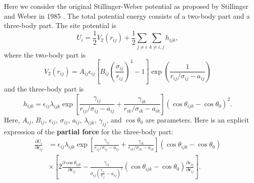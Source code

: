 \documentclass[12pt,a4paper]{report}
\newcommand{\vect}[1]{\boldsymbol{#1}}
\begin{document}
Here we consider the original Stillinger-Weber potential as proposed by Stillinger and Weber in 1985 \cite{stillinger1985prb}.
The total potential energy consists of a two-body part and a three-body part. The site potential is
\begin{equation}
U_i = \frac{1}{2} V_2(r_{ij}) + \frac{1}{2}\sum_{j\neq i}\sum_{k\neq i,j} h_{ijk},
\end{equation}
where the two-body part is
\begin{equation}
V_2(r_{ij}) =  A_{ij} \epsilon_{ij}
\left[
  B_{ij} \left( \frac{\sigma_{ij} }{ r_{ij} } \right)^{4}-1
\right]
\exp\left(   \frac{1}{ r_{ij} / \sigma_{ij} - a_{ij}} \right)
\end{equation}
and the three-body part is
\begin{equation}
h_{ijk}=\epsilon_{ij}\lambda_{ijk}
\exp
\left[
\frac{\gamma_{ij}}{r_{ij}/\sigma_{ij}-a_{ij}} + \frac{\gamma_{ik}}{r_{ik}/\sigma_{ik}-a_{ik}}
\right]
         \left(\cos \theta_{ijk} - \cos \theta_{0} \right)^2.
\end{equation}
Here, $A_{ij}$, $B_{ij}$, $\epsilon_{ij}$, $\sigma_{ij}$, $a_{ij}$, $\lambda_{ijk}$, $\gamma_{ij}$, and $\cos \theta_{0}$ are parameters. Here is an explicit expression of the \textbf{partial force} for the three-body part:
\begin{align}
\frac{\partial U_i}{\partial \vect{r}_{ij}}
&= \epsilon_{ij}\lambda_{ijk} \exp \left[
 \frac{\gamma_{ij}}{r_{ij}/\sigma_{ij}-a_{ij}} + \frac{\gamma_{ik}}{r_{ik}/\sigma_{ik}-a_{ik}}
\right] \left(\cos \theta_{ijk} - \cos \theta_{0} \right) \nonumber \\
&\times
\left[
  2 \frac{\partial \cos \theta_{ijk}} {\partial \vect{r}_{ij}} -
  \frac{\gamma_{ij}}{\sigma_{ij} \left( \frac{r_{ij}}{\sigma_{ij}} - a_{ij} \right)^2}
  \left(\cos \theta_{ijk} - \cos \theta_{0} \right)
  \frac{\partial r_{ij}} {\partial \vect{r}_{ij}}
\right].
\end{align}
\end{document}
